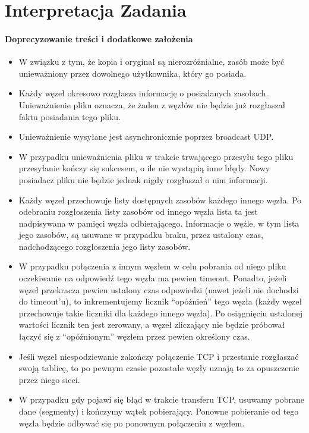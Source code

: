 \documentclass[11pt]{book}
\newcommand{\+}{\discretionary{\mbox{\scriptsize$\hookleftarrow$}}{}{}}
\begin{document}
\section{Interpretacja Zadania}
\paragraph{Doprecyzowanie treści i dodatkowe założenia}
\begin{itemize}
\item
W związku z tym, że kopia i oryginał są nierozróżnialne, zasób może być unieważniony przez dowolnego użytkownika, który go posiada.
\item
Każdy węzeł okresowo rozgłasza informację o posiadanych zasobach. Unieważnienie pliku oznacza, że żaden z węzłów nie będzie już rozgłaszał faktu posiadania tego pliku.
\item
Unieważnienie wysyłane jest asynchronicznie poprzez broadcast UDP.
\item
W przypadku unieważnienia pliku w trakcie trwającego przesyłu tego pliku przesyłanie kończy się sukcesem, o ile nie wystąpią inne błędy. Nowy posiadacz pliku nie będzie jednak nigdy rozgłaszał o nim informacji.
\item
Każdy węzeł przechowuje listy dostępnych zasobów każdego innego węzła. Po odebraniu rozgłoszenia listy zasobów od innego węzła lista ta jest nadpisywana w pamięci węzła odbierającego. Informacje o węźle, w tym lista jego zasobów, są usuwane w przypadku braku, przez ustalony czas, nadchodzącego rozgłoszenia jego listy zasobów. 
\item
W przypadku połączenia z innym węzłem w celu pobrania od niego pliku oczekiwanie na odpowiedź tego węzła ma pewien timeout. Ponadto, jeżeli węzeł przekracza pewien ustalony czas odpowiedzi (nawet jeżeli nie dochodzi do timeout’u), to inkrementujemy licznik “opóźnień” tego węzła (każdy węzeł przechowuje takie liczniki dla każdego innego węzła). Po osiągnięciu ustalonej wartości licznik ten jest zerowany, a węzeł zliczający nie będzie próbował łączyć się z “opóźnionym” węzłem przez pewien określony czas.
\item
Jeśli węzeł niespodziewanie zakończy połączenie TCP i przestanie rozgłaszać swoją tablicę, to po pewnym czasie pozostałe węzły uznają to za opuszczenie przez niego sieci.
\item
W przypadku gdy pojawi się błąd w trakcie transferu TCP, usuwamy pobrane dane (segmenty) i kończymy wątek pobierający. Ponowne pobieranie od tego węzła będzie odbywać się po ponownym połączeniu z węzłem.
\end{itemize}
\end{document}
